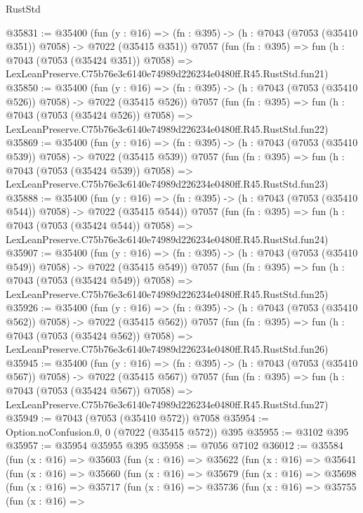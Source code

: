 \begin{lexlean}{RustStd}
\begin{coremodule}
@35831 := @35400
    (fun (y : @16) => (fn : @395) -> (h : @7043 (@7053 (@35410 @351)) @7058) -> @7022 (@35415 @351))
    @7057
    (fun (fn : @395) =>
    fun (h : @7043 (@7053 (@35424 @351)) @7058) =>
    LexLeanPreserve.C75b76e3c6140e74989d226234e0480ff.R45.RustStd.fun21)
@35850 := @35400
    (fun (y : @16) => (fn : @395) -> (h : @7043 (@7053 (@35410 @526)) @7058) -> @7022 (@35415 @526))
    @7057
    (fun (fn : @395) =>
    fun (h : @7043 (@7053 (@35424 @526)) @7058) =>
    LexLeanPreserve.C75b76e3c6140e74989d226234e0480ff.R45.RustStd.fun22)
@35869 := @35400
    (fun (y : @16) => (fn : @395) -> (h : @7043 (@7053 (@35410 @539)) @7058) -> @7022 (@35415 @539))
    @7057
    (fun (fn : @395) =>
    fun (h : @7043 (@7053 (@35424 @539)) @7058) =>
    LexLeanPreserve.C75b76e3c6140e74989d226234e0480ff.R45.RustStd.fun23)
@35888 := @35400
    (fun (y : @16) => (fn : @395) -> (h : @7043 (@7053 (@35410 @544)) @7058) -> @7022 (@35415 @544))
    @7057
    (fun (fn : @395) =>
    fun (h : @7043 (@7053 (@35424 @544)) @7058) =>
    LexLeanPreserve.C75b76e3c6140e74989d226234e0480ff.R45.RustStd.fun24)
@35907 := @35400
    (fun (y : @16) => (fn : @395) -> (h : @7043 (@7053 (@35410 @549)) @7058) -> @7022 (@35415 @549))
    @7057
    (fun (fn : @395) =>
    fun (h : @7043 (@7053 (@35424 @549)) @7058) =>
    LexLeanPreserve.C75b76e3c6140e74989d226234e0480ff.R45.RustStd.fun25)
@35926 := @35400
    (fun (y : @16) => (fn : @395) -> (h : @7043 (@7053 (@35410 @562)) @7058) -> @7022 (@35415 @562))
    @7057
    (fun (fn : @395) =>
    fun (h : @7043 (@7053 (@35424 @562)) @7058) =>
    LexLeanPreserve.C75b76e3c6140e74989d226234e0480ff.R45.RustStd.fun26)
@35945 := @35400
    (fun (y : @16) => (fn : @395) -> (h : @7043 (@7053 (@35410 @567)) @7058) -> @7022 (@35415 @567))
    @7057
    (fun (fn : @395) =>
    fun (h : @7043 (@7053 (@35424 @567)) @7058) =>
    LexLeanPreserve.C75b76e3c6140e74989d226234e0480ff.R45.RustStd.fun27)
@35949 := @7043 (@7053 (@35410 @572)) @7058
@35954 := Option.noConfusion.{0, 0} (@7022 (@35415 @572)) @395
@35955 := @3102 @395
@35957 := @35954 @35955 @395
@35958 := @7056 @7102
@36012 := @35584
    (fun (x : @16) =>
    @35603
      (fun (x : @16) =>
      @35622
        (fun (x : @16) =>
        @35641
          (fun (x : @16) =>
          @35660
            (fun (x : @16) =>
            @35679
              (fun (x : @16) =>
              @35698
                (fun (x : @16) =>
                @35717
                  (fun (x : @16) =>
                  @35736
                    (fun (x : @16) =>
                    @35755
                      (fun (x : @16) =>

\end{coremodule}
\end{lexlean}
